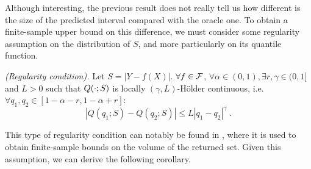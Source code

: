 Although interesting, the previous result does not really tell us how different is the size of the predicted interval compared with the oracle one. 
To obtain a finite-sample upper bound on this difference, we must consider some regularity assumption on the distribution of $S$, and more particularly on its quantile function.
%
\begin{assumption}\emph{(Regularity condition).}
    \label{ass:regularity}
    Let $S=|Y-f(X)|$. $\forall f\in \mathcal{F}$, $\forall \alpha \in (0,1), \exists r,\gamma \in (0,1]$ and $L>0$ such that $Q(\vspace{.2em}\cdot\vspace{.2em};S)$ is locally $(\gamma,L)$-Hölder continuous, i.e. $\forall q_1,q_2 \in [1-\alpha - r, 1-\alpha + r]$: $$|Q(q_1;S) - Q(q_2;S)|\leq L|q_1-q_2|^\gamma \; .$$
%
\end{assumption}
%
This type of regularity condition can notably be found in \citet{lei2013distribution,yang2024selection}, where it is used to obtain finite-sample bounds on the volume of the returned set. Given this assumption, we can derive the following corollary.

